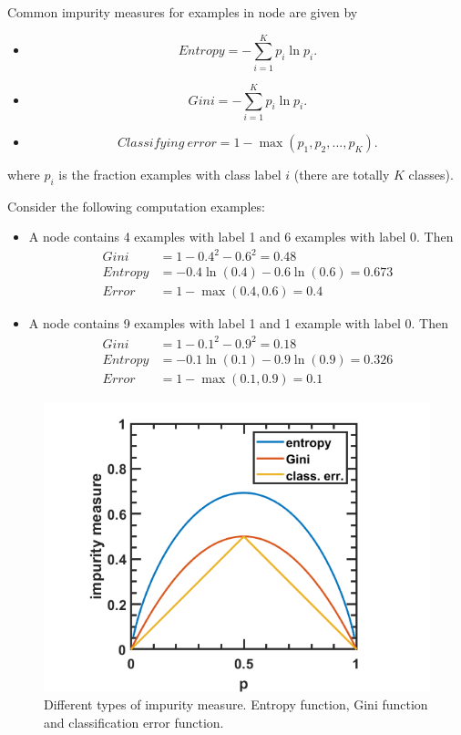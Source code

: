 \begin{refsection}
\begin{definition}
Common impurity measures for examples in node are given by
\begin{itemize}
	\item $$Entropy = -\sum_{i=1}^K p_i\ln p_i.$$
	\item $$Gini = -\sum_{i=1}^K p_i\ln p_i.$$
	\item $$Classifying~error = 1 - \max (p_1, p_2,...,p_K).$$
\end{itemize}	
where $p_i$ is the fraction examples with class label $i$ (there are totally $K$ classes).
\end{definition}


\begin{example}
Consider the following computation examples:
\begin{itemize}
	\item A node contains 4 examples with label 1 and 6 examples with label 0. Then
	\begin{align*}
	Gini &= 1 - 0.4^2 - 0.6^2 = 0.48 \\
	Entropy &= -0.4\ln(0.4) - 0.6\ln(0.6) = 0.673 \\
	Error &= 1 - \max(0.4,0.6) = 0.4 
	\end{align*}
	\item A node contains 9 examples with label 1 and 1 example with label 0. Then
	\begin{align*}
	Gini &= 1 - 0.1^2 - 0.9^2 = 0.18 \\
	Entropy &= -0.1\ln(0.1) - 0.9\ln(0.9) = 0.326 \\
	Error &= 1 - \max(0.1,0.9) = 0.1 
	\end{align*}
\end{itemize}
\end{example}


\begin{figure}[H]
	\centering
	\includegraphics[width=0.5\linewidth]{../figures/statisticalLearning/treeMethods/impurityMeasure}
	\caption{Different types of impurity measure. Entropy function, Gini function and classification error function.}
	\label{ch:statistical-learning:fig:impuritymeasure}
\end{figure}




\end{refsection}
